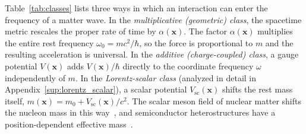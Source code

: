 \documentclass[aps,prd,onecolumn,tightenlines,nofootinbib,notitlepage,11pt,floatfix]{revtex4-2}
\theoremstyle{indentedtheorem}
\begin{document}
Table~\ref{tab:classes} lists three ways in which an interaction can enter the frequency of a matter wave. In the \emph{multiplicative (geometric) class}, the spacetime metric rescales the proper rate of time by $\alpha(\mathbf{x})$. The factor $\alpha(\mathbf{x})$ multiplies the entire rest frequency $\omega_0 = mc^2/\hbar$, so the force is proportional to $m$ and the resulting acceleration is universal. In the \emph{additive (charge-coupled) class}, a gauge potential $V(\mathbf{x})$ adds $V(\mathbf{x})/\hbar$ directly to the coordinate frequency $\omega$ independently of $m$. In the \emph{Lorentz-scalar class} (analyzed in detail in Appendix~\ref{sup:lorentz_scalar}), a scalar potential $V_\text{sc}(\mathbf{x})$ shifts the rest mass itself, $m(\mathbf{x}) = m_0 + V_\text{sc}(\mathbf{x})/c^2$. The scalar meson field of nuclear matter shifts the nucleon mass in this way~\citep{Walecka1974Theory}, and semiconductor heterostructures have a position-dependent effective mass~\citep{Bastard1988Wave}.
\end{document}
